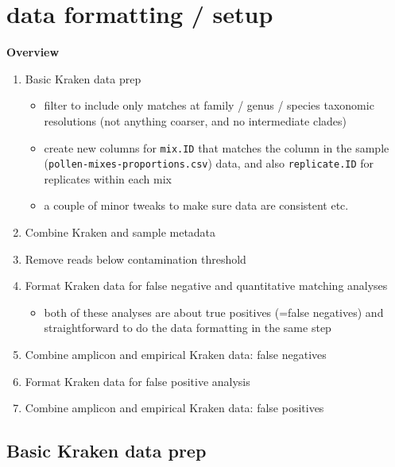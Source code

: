 \documentclass[
]{article}
\providecommand{\tightlist}{%
  \setlength{\itemsep}{0pt}\setlength{\parskip}{0pt}}
\begin{document}
\hypertarget{data-formatting-setup}{%
\section{data formatting / setup}\label{data-formatting-setup}}

\textbf{Overview}

\begin{enumerate}
\def\labelenumi{\arabic{enumi}.}
\tightlist
\item
  Basic Kraken data prep

  \begin{itemize}
  \tightlist
  \item
    filter to include only matches at family / genus / species taxonomic
    resolutions (not anything coarser, and no intermediate clades)
  \item
    create new columns for \texttt{mix.ID} that matches the column in
    the sample (\texttt{pollen-mixes-proportions.csv}) data, and also
    \texttt{replicate.ID} for replicates within each mix
  \item
    a couple of minor tweaks to make sure data are consistent etc.
  \end{itemize}
\item
  Combine Kraken and sample metadata
\item
  Remove reads below contamination threshold
\item
  Format Kraken data for false negative and quantitative matching
  analyses

  \begin{itemize}
  \tightlist
  \item
    both of these analyses are about true positives (=false negatives)
    and straightforward to do the data formatting in the same step
  \end{itemize}
\item
  Combine amplicon and empirical Kraken data: false negatives
\item
  Format Kraken data for false positive analysis
\item
  Combine amplicon and empirical Kraken data: false positives
\end{enumerate}

\hypertarget{basic-kraken-data-prep}{%
\subsection{Basic Kraken data prep}\label{basic-kraken-data-prep}}
\end{document}
